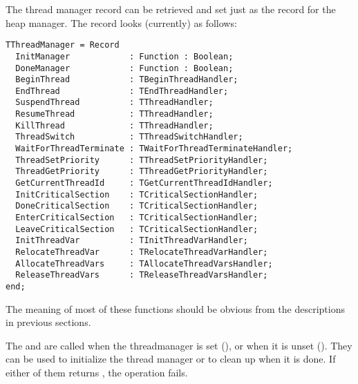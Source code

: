 The thread manager record can be retrieved and set just as the record for
the heap manager. The record looks (currently) as follows:
\begin{verbatim}
TThreadManager = Record
  InitManager            : Function : Boolean;
  DoneManager            : Function : Boolean;
  BeginThread            : TBeginThreadHandler;
  EndThread              : TEndThreadHandler;
  SuspendThread          : TThreadHandler;
  ResumeThread           : TThreadHandler;
  KillThread             : TThreadHandler;
  ThreadSwitch           : TThreadSwitchHandler;
  WaitForThreadTerminate : TWaitForThreadTerminateHandler;
  ThreadSetPriority      : TThreadSetPriorityHandler;
  ThreadGetPriority      : TThreadGetPriorityHandler;
  GetCurrentThreadId     : TGetCurrentThreadIdHandler;
  InitCriticalSection    : TCriticalSectionHandler;
  DoneCriticalSection    : TCriticalSectionHandler;
  EnterCriticalSection   : TCriticalSectionHandler;
  LeaveCriticalSection   : TCriticalSectionHandler;
  InitThreadVar          : TInitThreadVarHandler;
  RelocateThreadVar      : TRelocateThreadVarHandler;
  AllocateThreadVars     : TAllocateThreadVarsHandler;
  ReleaseThreadVars      : TReleaseThreadVarsHandler;
end;
\end{verbatim}
The meaning of most of these functions should be obvious from the descriptions in
previous sections.

The  and  are called when the
threadmanager is set (), or when it is unset
(). They can be used to initialize the thread manager or to
clean up when it is done. If either of them returns , the
operation fails.

